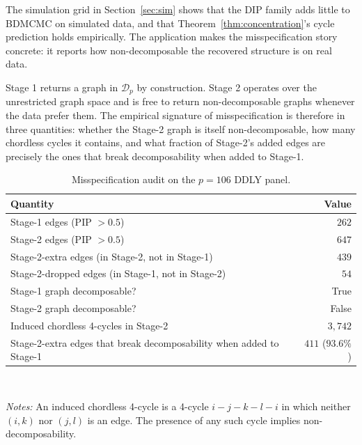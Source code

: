 The simulation grid in Section~\ref{sec:sim} shows that the DIP family adds little to BDMCMC on simulated data, and that Theorem~\ref{thm:concentration}'s cycle prediction holds empirically. The application makes the misspecification story concrete: it reports how non-decomposable the recovered structure is on real data.

Stage 1 returns a graph in $\mathcal{D}_p$ by construction. Stage 2 operates over the unrestricted graph space and is free to return non-decomposable graphs whenever the data prefer them. The empirical signature of misspecification is therefore in three quantities: whether the Stage-2 graph is itself non-decomposable, how many chordless cycles it contains, and what fraction of Stage-2's added edges are precisely the ones that break decomposability when added to Stage-1.

\begin{table}[H]
    \centering
    \caption{Misspecification audit on the $p = 106$ DDLY panel.}
    \label{tab:ddly-misspec}
    \begin{tabular}{lr}
        \toprule
        Quantity & Value \\
        \midrule
        Stage-1 edges (PIP $> 0.5$) & $262$ \\
        Stage-2 edges (PIP $> 0.5$) & $647$ \\
        Stage-2-extra edges (in Stage-2, not in Stage-1) & $439$ \\
        Stage-2-dropped edges (in Stage-1, not in Stage-2) & $54$ \\
        Stage-1 graph decomposable? & True \\
        Stage-2 graph decomposable? & False \\
        Induced chordless 4-cycles in Stage-2 & $3{,}742$ \\
        Stage-2-extra edges that break decomposability when added to Stage-1 & $411$ ($93.6\%$) \\
        \bottomrule
    \end{tabular}
    \\[0.4em]
    \begin{minipage}{0.85\linewidth}
        \footnotesize
        \emph{Notes:} An induced chordless 4-cycle is a 4-cycle $i \! - \! j \! - \! k \! - \! l \! - \! i$ in which neither $(i, k)$ nor $(j, l)$ is an edge. The presence of any such cycle implies non-decomposability.
    \end{minipage}
\end{table}

